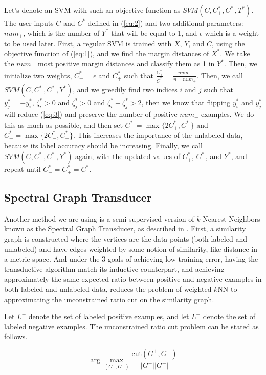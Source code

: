 \documentclass[11pt]{article}
\begin{document}
Let's denote an SVM with such an objective function as $SVM(C,C^*_+,C^*_-,T^*)$.
The user inputs $C$ and $C^*$ defined in (\ref{eq:2}) and two additional parameters: $num_+$, which is the number of $Y^*$ that will be equal to 1, and $\epsilon$ which is a weight to be used later. First, a regular SVM is trained with $X$, $Y$, and $C$, using the objective function of (\ref{eq:1}), and we find the margin distances of $X^*$. We take the $num_+$ most positive margin distances and classify them as 1 in $Y^*$. Then, we initialize two weights, $C^*_- = \epsilon$ and $C^*_+$ such that $\frac{C^*_+}{C^*_-} = \frac{num_+}{n-num_+}$. Then, we call $SVM(C,C^*_+,C^*_-,Y^*)$, and we greedily find two indices $i$ and $j$ such that $y^*_j = -y^*_i$, $\zeta^*_i > 0$ and $\zeta^*_j > 0$ and $\zeta^*_i+\zeta^*_j > 2$, then we know that flipping $y^*_i$ and $y^*_j$ will reduce (\ref{eq:3}) and preserve the number of positive $num_+$ examples. We do this as much as possible, and then set $C^*_+ = \max\{2C^*_+, C^*_+\}$ and $C^*_- = \max\{2C^*_-, C^*_-\}$. This increases the importance of the unlabeled data, because its label accuracy should be increasing. Finally, we call $SVM(C,C^*_+,C^*_-,Y^*)$ again, with the updated values of $C^*_+$, $C^*_-$, and $Y^*$, and repeat until $C^*_- = C^*_+ = C^*$.

\subsection{Spectral Graph Transducer}
Another method we are using is a semi-supervised version of $k$-Nearest Neighbors known as the Spectral Graph Transducer, as described in \cite{joachims2003transductive}. First, a similarity
graph is constructed where the vertices are the data points (both labeled
and unlabeled) and have edges weighted by some notion of similarity, like
distance in a metric space.
And under the 3 goals of achieving low training error, having the 
transductive algorithm match its inductive counterpart, and achieving
approximately the same expected ratio between positive and negative examples 
in both labeled and unlabeled data, \cite{joachims2003transductive}
reduces the problem of weighted $k$NN to approximating the unconstrained
ratio cut on the similarity graph.

Let $L^+$ denote the set of labeled positive examples, and let
$L^-$ denote the set of labeled negative examples.
The unconstrained ratio cut problem can be stated as follows.

\[\arg\max_{(G^+, G^-)}\frac{\mathrm{cut}(G^+,
G^-)}{\lvert G^+\rvert\lvert G^-\rvert}\]
\end{document}
